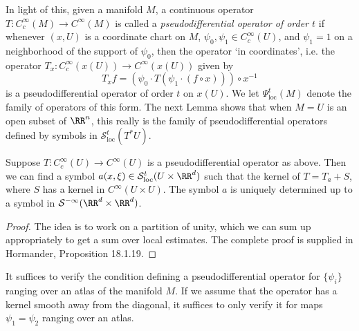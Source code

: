 In light of this, given a manifold $M$, a continuous operator $T: C_c^\infty(M) \to C^\infty(M)$ is called a \emph{pseudodifferential operator of order $t$} if whenever $(x,U)$ is a coordinate chart on $M$, $\psi_0, \psi_1 \in C_c^\infty(U)$, and $\psi_1 = 1$ on a neighborhood of the support of $\psi_0$, then the operator `in coordinates', i.e. the operator $T_x: C_c^\infty(x(U)) \to C^\infty(x(U))$ given by
%
\[ T_x f = \left( \psi_0 \cdot T(\psi_1 \cdot (f \circ x)) \right) \circ x^{-1} \]
%
is a pseudodifferential operator of order $t$ on $x(U)$. We let $\Psi_{\text{loc}}^t(M)$ denote the family of operators of this form. The next Lemma shows that when $M = U$ is an open subset of $\RR^n$, this really is the family of pseudodifferential operators defined by symbols in $\mathcal{S}^t_{\text{loc}}(T^* U)$.

\begin{lemma}
    Suppose $T: C_c^\infty(U) \to C^\infty(U)$ is a pseudodifferential operator as above. Then we can find a symbol $a(x,\xi) \in \mathcal{S}^t_{\text{loc}}(U \times \RR^d)$ such that the kernel of $T = T_a + S$, where $S$ has a kernel in $C^\infty(U \times U)$. The symbol $a$ is uniquely determined up to a symbol in $\mathcal{S}^{-\infty}(\RR^d \times \RR^d)$.
\end{lemma}
\begin{proof}
    The idea is to work on a partition of unity, which we can sum up appropriately to get a sum over local estimates. The complete proof is supplied in Hormander, Proposition 18.1.19.
\end{proof}

\begin{remark}
    It suffices to verify the condition defining a pseudodifferential operator for $\{ \psi_i \}$ ranging over an atlas of the manifold $M$. If we assume that the operator has a kernel smooth away from the diagonal, it suffices to only verify it for maps $\psi_1 = \psi_2$ ranging over an atlas.
\end{remark}

